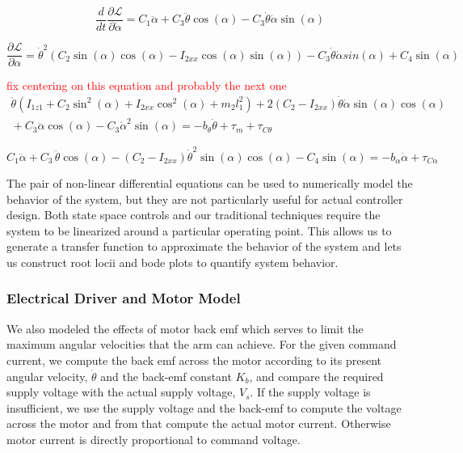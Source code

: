 \documentclass{article}
\newcommand{\xxx}[1]{\textcolor{red}{#1}}
\theoremstyle{plain}
\theoremstyle{definition}
\theoremstyle{remark}
\newcommand{\Lagr}{\mathcal{L}}
\begin{document}
$$ \frac{d}{dt} \frac{\partial \Lagr}{\partial \dot{\alpha}} = C_1 \ddot{\alpha} + C_3 \ddot{\theta}  \cos(\alpha) - C_3 \dot{\theta} \dot{\alpha} \sin(\alpha) $$

$$ \frac{\partial \Lagr}{\partial \alpha} = \dot{\theta}^2 \left( C_2 \sin(\alpha) \cos(\alpha) - I_{2xx} \cos(\alpha) \sin(\alpha)\right) - C_3 \dot{\theta} \dot{\alpha} sin(\alpha) + C_4  \sin(\alpha) $$

\xxx{fix centering on this equation and probably the next one}
\begin{align} 
\ddot{\theta} \left( I_{1z1} + C_2 \sin^2(\alpha) + I_{2xx} \cos^2(\alpha) + m_2 l_1^2\right) + 2 (C_2 - I_{2xx}) \dot{\theta} \dot{\alpha}  \sin(\alpha)  \cos(\alpha) \nonumber \\ {} + C_3  \ddot{\alpha}  \cos(\alpha)  - C_3  \dot{\alpha}^2 \sin(\alpha)  = -b_{\theta}  \dot{\theta} + \tau_{m} + \tau_{C \theta}
\label{NonLin1}
\end{align}

\begin{equation}
C_1 \ddot{\alpha} + C_3 \, \ddot{\theta} \cos(\alpha) - (C_2 - I_{2xx}) \dot{\theta}^2  \sin(\alpha) \cos(\alpha) - C_4 \sin(\alpha) = -b_{\alpha} \dot{\alpha} + \tau_{C \alpha}
\label{NonLin2}
\end{equation}

The pair of non-linear differential equations can be used to numerically model the behavior of the system, but they are not particularly useful for actual controller design.  Both state space controls and our traditional techniques require the system to be linearized around a particular operating point.  This allows us to generate a transfer function to approximate the behavior of the system and lets us construct root locii and bode plots to quantify system behavior.  

\subsubsection*{Electrical Driver and Motor Model}

We also modeled the effects of motor back emf which serves to limit the maximum angular velocities that the arm can achieve. For the given command current, we compute the back emf across the motor according to its present angular velocity, $\dot{\theta}$ and the back-emf constant $K_b$, and compare the required supply voltage with the actual supply voltage, $V_{s}$.  If the supply voltage is insufficient, we use the supply voltage and the back-emf to compute the voltage across the motor and from that compute the actual motor current.  Otherwise motor current is directly proportional to command voltage. 
\end{document}
